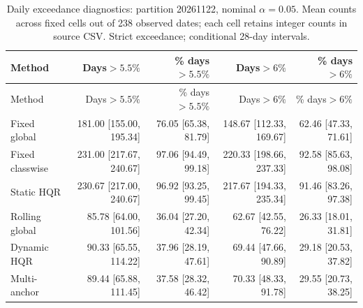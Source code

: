 \begingroup\small\setlength{\tabcolsep}{3pt}
\begin{longtable}{lrrrr}
\caption{Daily exceedance diagnostics: partition 20261122, nominal $\alpha=0.05$. Mean counts across fixed cells out of 238 observed dates; each cell retains integer counts in source CSV. Strict exceedance; conditional 28-day intervals.}\label{tab:final-risk-1-0-exceed}\\
\toprule
Method & Days$>5.5\%$ & \% days$>5.5\%$ & Days$>6\%$ & \% days$>6\%$\\
\midrule
\endfirsthead
\toprule
Method & Days$>5.5\%$ & \% days$>5.5\%$ & Days$>6\%$ & \% days$>6\%$\\
\midrule
\endhead
Fixed global & 181.00 [155.00, 195.34] & 76.05 [65.38, 81.79] & 148.67 [112.33, 169.67] & 62.46 [47.33, 71.61]\\
Fixed classwise & 231.00 [217.67, 240.67] & 97.06 [94.49, 99.18] & 220.33 [198.66, 237.33] & 92.58 [85.63, 98.08]\\
Static HQR & 230.67 [217.00, 240.67] & 96.92 [93.25, 99.45] & 217.67 [194.33, 235.34] & 91.46 [83.26, 97.38]\\
Rolling global & 85.78 [64.00, 101.56] & 36.04 [27.20, 42.34] & 62.67 [42.55, 76.22] & 26.33 [18.01, 31.81]\\
Dynamic HQR & 90.33 [65.55, 114.22] & 37.96 [28.19, 47.61] & 69.44 [47.66, 90.89] & 29.18 [20.53, 37.82]\\
Multi-anchor & 89.44 [65.88, 111.45] & 37.58 [28.32, 46.42] & 70.33 [48.33, 91.78] & 29.55 [20.73, 38.25]\\
\bottomrule
\end{longtable}
\endgroup
